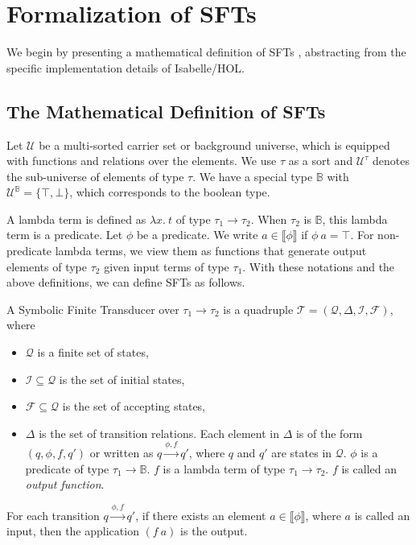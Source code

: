 \documentclass[a4paper,UKenglish,cleveref, autoref, thm-restate]{lipics-v2021}
\begin{document}
\section{Formalization of SFTs}
\label{sec:formalization}


We begin by presenting a mathematical definition of SFTs \cite{VeanesHLMB12Transducer}, abstracting from the specific implementation details of Isabelle/HOL. 
\subsection{The Mathematical Definition of SFTs}

Let $\mathcal{U}$ be a multi-sorted carrier set or background universe, which is equipped with functions and relations over the elements. We use $\tau$ as a sort and $\mathcal{U}^\tau$ denotes the sub-universe of elements of type $\tau$. 
We have a special type $\mathbb{B}$ with $\mathcal{U}^\mathbb{B} = \{ \top, \bot\}$, which corresponds to the boolean type. 

A lambda term is defined as $\lambda x.~t$ of type $\tau_1 \rightarrow \tau_2$.
When $\tau_2$ is $\mathbb{B}$, this lambda term is a predicate. Let $\phi$ be a predicate. We write $a\in \llbracket\phi \rrbracket$ if $\phi~a=\top$. For non-predicate lambda terms, we view them as functions that generate output elements of type $\tau_2$ given input terms of type $\tau_1$. 
With these notations and the above definitions, we can define SFTs as follows.

\begin{definition}
\label{def-sft}
   A Symbolic Finite Transducer over $\tau_1\rightarrow \tau_2$ is a quadruple $\mathcal{T} = (\mathcal{Q}, \Delta, \mathcal{I}, \mathcal{F})$, where 
   \begin{itemize}
   \item $\mathcal{Q}$ is a finite set of states,
   \item $\mathcal{I}\subseteq \mathcal{Q}$ is the set of initial states,
   \item $\mathcal{F} \subseteq\mathcal{Q}$ is the set of accepting states,
   \item $\Delta$ is the set of transition relations. Each element in $\Delta$ is of the form $(q, \phi, f, q')$ or written as $q\xrightarrow{\phi, f} q'$, where $q$ and $q'$ are states in $\mathcal{Q}$.
   $\phi$ is a predicate of type $\tau_1\rightarrow \mathbb{B}$.
   $f$ is a lambda term of type $\tau_1\rightarrow \tau_2$. $f$ is called an \emph{output function}.
   \end{itemize}

For each transition $q\xrightarrow{\phi, f} q'$, if there exists an element $a\in \llbracket \phi \rrbracket$, where $a$ is called an input,  then the application $(f~a)$ is the output.
   
\end{definition}
\end{document}

